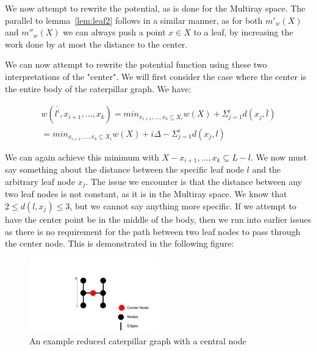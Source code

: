 We now attempt to rewrite the potential, as is done for the Multiray space. The parallel to lemma~\ref{lem:leaf2} follows in a similar manner, as for both $m'_w(X)$ and $m''_w(X)$ we can always push a point $x \in X$ to a leaf, by increasing the work done by at most the distance to the center.

We can now attempt to rewrite the potential function using these two interpretations of the "center". We will first consider the case where the center is the entire body of the caterpillar graph. We have:

\begin{equation*}
    \begin{gathered}
    w(\bar{l^i}, x_{i+1}, ..., x_k) = min_{x_{i+1}, ..., x_k \subseteq X_i} w(X) + \Sigma_{j=1}^i d(x_j, \bar{l})\\
    = min_{x_{i+1}, ..., x_k \subseteq X_i} w(X) + i\Delta - \Sigma_{j=1}^i d(x_j, l)
    \end{gathered}
\end{equation*}

We can again achieve this minimum with $X-x_{i+1}, ..., x_k\subseteq L-l$. We now must say something about the distance between the specific leaf node $l$ and the arbitrary leaf node $x_j$. The issue we encounter is that the distance between any two leaf nodes is not constant, as it is in the Multiray space. We know that $2 \leq d(l, x_j) \leq 3$, but we cannot say anything more specific. If we attempt to have the center point be in the middle of the body, then we run into earlier issues as there is no requirement for the path between two leaf nodes to pass through the center node. This is demonstrated in the following figure:

\begin{figure}[H]
    \centering
    \includegraphics[width=0.5\textwidth]{images/center2.png}
    \caption{An example reduced caterpillar graph with a central node}
\end{figure}

